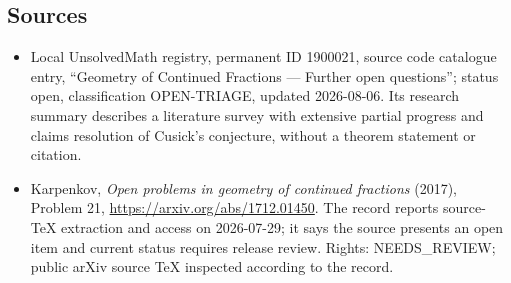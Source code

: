 \documentclass[11pt]{article}
\begin{document}
\subsection{Sources}
\begin{itemize}
\item Local UnsolvedMath registry, permanent ID 1900021, source code catalogue entry, ``Geometry of Continued Fractions --- Further open questions''; status open, classification OPEN-TRIAGE, updated 2026-08-06. Its research summary describes a literature survey with extensive partial progress and claims resolution of Cusick's conjecture, without a theorem statement or citation.
\item Karpenkov, \emph{Open problems in geometry of continued fractions} (2017), Problem 21, \url{https://arxiv.org/abs/1712.01450}. The record reports source-TeX extraction and access on 2026-07-29; it says the source presents an open item and current status requires release review. Rights: NEEDS\_REVIEW; public arXiv source TeX inspected according to the record.
\end{itemize}
\end{document}
